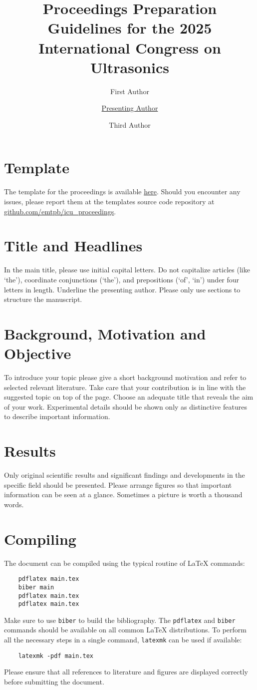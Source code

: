 \documentclass{ama}
\title{Proceedings Preparation Guidelines for the 2025 International Congress on Ultrasonics}
\author[1]{First Author}
\author[1]{\underline{Presenting Author}}
\author[2]{Third Author}
\affil[1]{Institution or company, address and country}
\affil[2]{Institution or company, address and country}
\begin{document}
\section{Template}
The template for the proceedings is available \href{https://github.com/emtpb/icu_proceedings/archive/refs/heads/main.zip}{\underline{here}}.
Should you encounter any issues, please report them at the templates source code repository at \href{https://github.com/emtpb/icu_proceedings}{\underline{github.com/emtpb/icu\_proceedings}}.

\section{Title and Headlines}
In the main title, please use initial capital letters.
Do not capitalize articles (like `the'), coordinate conjunctions (`the'), and prepositions (`of', `in') under four letters in length.
Underline the presenting author.
Please only use sections to structure the manuscript.

\section{Background, Motivation and Objective}
To introduce your topic please give a short background motivation and refer to selected relevant literature.
Take care that your contribution is in line with the suggested topic on top of the page.
Choose an adequate title that reveals the aim of your work.
Experimental details should be shown only as distinctive features to describe important information.

\section{Results}
Only original scientific results and significant findings and developments in the specific field should be presented.
Please arrange figures so that important information can be seen at a glance.
Sometimes a picture is worth a thousand words.

\section{Compiling}
The document can be compiled using the typical routine of \LaTeX{} commands:
%
\begin{verbatim}
    pdflatex main.tex
    biber main
    pdflatex main.tex
    pdflatex main.tex
\end{verbatim}
%
Make sure to use \texttt{biber} to build the bibliography.
The \texttt{pdflatex} and \texttt{biber} commands should be available on all common \LaTeX{} distributions.
To perform all the necessary steps in a single command, \texttt{latexmk} can be used if available:
%
\begin{verbatim}
    latexmk -pdf main.tex
\end{verbatim}
%
Please ensure that all references to literature and figures are displayed correctly before submitting the document.
\end{document}
